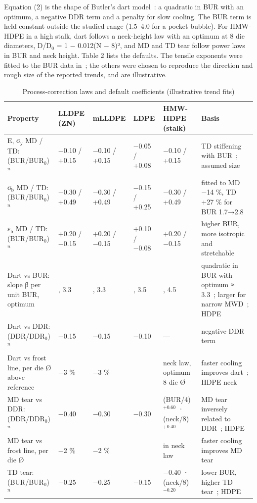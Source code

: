 \documentclass[conference,a4paper]{IEEEtran}
\begin{document}
Equation (2) is the shape of Butler's dart model~\cite{r4}: a quadratic in BUR with an optimum, a negative DDR term and a penalty for slow cooling. The BUR term is held constant outside the studied range (1.5–4.0 for a pocket bubble). For HMW-HDPE in a high stalk, dart follows a neck-height law with an optimum at 8 die diameters, D/D$_{\mathrm{0}}$ = 1 − 0.012(N − 8)², and MD and TD tear follow power laws in BUR and neck height. Table 2 lists the defaults. The tensile exponents were fitted to the BUR data in~\cite{r2}; the others were chosen to reproduce the direction and rough size of the reported trends, and are illustrative.

\begin{table}[!t]
\caption{Process-correction laws and default coefficients (illustrative trend fits)}
\label{tab:coef}
\centering\scriptsize
\begin{tabularx}{\textwidth}{>{\raggedright\arraybackslash\hsize=1.481\hsize}X>{\raggedright\arraybackslash\hsize=0.701\hsize}X>{\raggedright\arraybackslash\hsize=0.701\hsize}X>{\raggedright\arraybackslash\hsize=0.623\hsize}X>{\raggedright\arraybackslash\hsize=1.091\hsize}X>{\raggedright\arraybackslash\hsize=1.403\hsize}X}
\toprule
\textbf{Property} & \textbf{LLDPE (ZN)} & \textbf{mLLDPE} & \textbf{LDPE} & \textbf{HMW-HDPE (stalk)} & \textbf{Basis} \\
\midrule
E, σ$_{\mathrm{y}}$ MD / TD: (BUR/BUR$_{\mathrm{0}}$)$^{n}$ & −0.10 / +0.15 & −0.10 / +0.15 & −0.05 / +0.08 & −0.10 / +0.15 & TD stiffening with BUR~\cite{r2,r3}; assumed size \\
σ$_{\mathrm{b}}$ MD / TD: (BUR/BUR$_{\mathrm{0}}$)$^{n}$ & −0.30 / +0.49 & −0.30 / +0.49 & −0.15 / +0.25 & −0.30 / +0.49 & fitted to MD −14 \%, TD +27 \% for BUR 1.7→2.8~\cite{r2} \\
ε$_{\mathrm{b}}$ MD / TD: (BUR/BUR$_{\mathrm{0}}$)$^{n}$ & +0.20 / −0.15 & +0.20 / −0.15 & +0.10 / −0.08 & +0.20 / −0.15 & higher BUR, more isotropic and stretchable~\cite{r18} \\
Dart vs BUR: slope β per unit BUR, optimum & 0.25, 3.3 & 0.30, 3.3 & 0.15, 3.5 & 0.15, 4.5 & quadratic in BUR with optimum ≈ 3.3~\cite{r4}; larger for narrow MWD~\cite{r3}; HDPE~\cite{r9} \\
Dart vs DDR: (DDR/DDR$_{\mathrm{0}}$)$^{n}$ & −0.15 & −0.15 & −0.10 & — & negative DDR term~\cite{r4,r5} \\
Dart vs frost line, per die Ø above reference & −3 \% & −3 \% & 0 & neck law, optimum 8 die Ø & faster cooling improves dart~\cite{r4}; HDPE neck~\cite{r8,r9} \\
MD tear vs DDR: (DDR/DDR$_{\mathrm{0}}$)$^{n}$ & −0.40 & −0.30 & −0.30 & (BUR/4)$^{+0.60}$ · (neck/8)$^{+0.40}$ & MD tear inversely related to DDR~\cite{r5,r16}; HDPE~\cite{r7,r8} \\
MD tear vs frost line, per die Ø & −2 \% & −2 \% & 0 & in neck law & faster cooling improves MD tear~\cite{r4} \\
TD tear: (BUR/BUR$_{\mathrm{0}}$)$^{n}$ & −0.25 & −0.25 & −0.15 & −0.40 · (neck/8)$^{−0.20}$ & lower BUR, higher TD tear~\cite{r8}; HDPE~\cite{r7} \\
\bottomrule
\end{tabularx}
\end{table}
\end{document}
